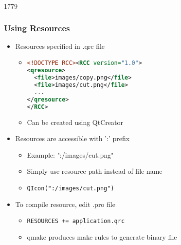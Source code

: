 \begin{slide}[fragile]{1779}\frametitle{Using Resources}
  \begin{itemize}
  \item Resources specified in .qrc  file
    \begin{itemize}
    \item [] \begin{lstlisting}[language=xml]
<!DOCTYPE RCC><RCC version="1.0">
<qresource>
  <file>images/copy.png</file>
  <file>images/cut.png</file>
  ...
</qresource>
</RCC>      
    \end{lstlisting}
   \item Can be created using QtCreator
    \end{itemize}
  \item Resources are accessible with ':' prefix
    \begin{itemize}
    \item Example: ":/images/cut.png"
    \item Simply use resource path instead of file name
    \item \texttt{QIcon(":/images/cut.png")}
    \end{itemize}
  \item To compile resource, edit .pro file
    \begin{itemize}
    \item \texttt{RESOURCES += application.qrc}
    \item qmake produces make rules to generate binary file
   \end{itemize}
  \end{itemize}
\end{slide}

